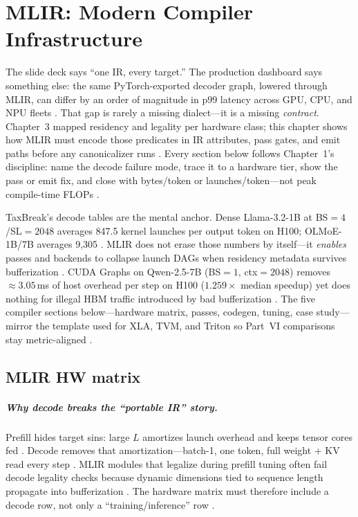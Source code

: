 \chapter{MLIR: Modern Compiler Infrastructure}
\label{chap:ch14}

The slide deck says ``one IR, every target.'' The production dashboard says something else: the same PyTorch-exported decoder graph, lowered through MLIR, can differ by an order of magnitude in p99 latency across GPU, CPU, and NPU fleets \citep{patel2025llminference,chen2020compilerbasedhardw}. That gap is rarely a missing dialect---it is a missing \emph{contract}. Chapter~3 mapped residency and legality per hardware class; this chapter shows how MLIR must encode those predicates in IR attributes, pass gates, and emit paths before any canonicalizer runs \citep{amd2024xdna,yirage2026}. Every section below follows Chapter~1's discipline: name the decode failure mode, trace it to a hardware tier, show the pass or emit fix, and close with bytes/token or launches/token---not peak compile-time FLOPs \citep{taxbreak2026,memoryfloor2026}.

TaxBreak's decode tables are the mental anchor. Dense Llama-3.2-1B at BS${=}4$/SL${=}2048$ averages 847.5 kernel launches per output token on H100; OLMoE-1B/7B averages 9,305 \citep{taxbreak2026}. MLIR does not erase those numbers by itself---it \emph{enables} passes and backends to collapse launch DAGs when residency metadata survives bufferization \citep{nvidia2024cudagraphs,dao2022flashattention}. CUDA Graphs on Qwen-2.5-7B (BS${=}1$, ctx${=}2048$) removes ${\approx}3.05$\,ms of host overhead per step on H100 ($1.259\times$ median speedup) yet does nothing for illegal HBM traffic introduced by bad bufferization \citep{memoryfloor2026}. The five compiler sections below---hardware matrix, passes, codegen, tuning, case study---mirror the template used for XLA, TVM, and Triton so Part~VI comparisons stay metric-aligned \citep{chen2020compilerbasedhardw}.

\section{MLIR HW matrix}
\label{sec:ch14_mlir_hw_matrix}

\paragraph{Why decode breaks the ``portable IR'' story.} Prefill hides target sins: large $L$ amortizes launch overhead and keeps tensor cores fed \citep{dao2022flashattention,patel2025llminference}. Decode removes that amortization---batch-1, one token, full weight + KV read every step \citep{memoryfloor2026,dlbook}. MLIR modules that legalize during prefill tuning often fail decode legality checks because dynamic dimensions tied to sequence length propagate into bufferization \citep{kwon2023vllm,amd2024xdna}. The hardware matrix must therefore include a decode row, not only a ``training/inference'' row \citep{yirage2026,taxbreak2026}.

